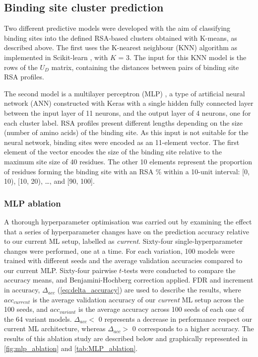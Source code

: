 \subsection{Binding site cluster prediction}

Two different predictive models were developed with the aim of classifying binding sites into the defined RSA-based clusters obtained with K-means, as described above. The first  uses the K-nearest neighbour (KNN) algorithm as implemented in Scikit-learn \cite{PEDREGOSA_2011_SKLEARN}, with $K$ = 3. The input for this KNN model is the rows of the $U_{D}$ matrix, containing the distances between pairs of binding site RSA profiles.

The second model is a multilayer perceptron (MLP) \cite{CYBENKO_1989_MLP}, a type of artificial neural network (ANN) constructed with Keras \cite{CHOLLET_2015_KERAS} with a single hidden fully connected layer between the input layer of 11 neurons, and the output layer of 4 neurons, one for each cluster label. RSA profiles present different lengths depending on the size (number of amino acids) of the binding site. As this input is not suitable for the neural network, binding sites were encoded as an 11-element vector. The first element of the vector encodes the size of the binding site relative to the maximum site size of 40 residues. The other 10 elements represent the proportion of residues forming the binding site with an RSA \% within a 10-unit interval: [0, 10), [10, 20), …, and [90, 100].

\subsubsection{MLP ablation}

A thorough hyperparameter optimisation was carried out by examining the effect that a series of hyperparameter changes have on the prediction accuracy relative to our current ML setup, labelled as \textit{current}. Sixty-four single-hyperparameter changes were performed, one at a time. For each variation, 100 models were trained with different seeds and the average validation accuracies compared to our current MLP. Sixty-four pairwise $t$-tests were conducted to compare the accuracy means, and Benjamini-Hochberg correction \cite{BENJAMINI_1995_FDR} applied. FDR and increment in accuracy, $\Delta_{acc}$ (\autoref{eq:delta_accuracy}) are used to describe the results, where $acc_{current}$ is the average validation accuracy of our \textit{current} ML setup across the 100 seeds, and $acc_{variant}$ is the average accuracy across 100 seeds of each one of the 64 variant models. $\Delta_{acc} <$ 0 represents a decrease in performance respect our current ML architecture, whereas $\Delta_{acc} >$ 0 corresponds to a higher accuracy. The results of this ablation study are described below and graphically represented in \autoref{fig:mlp_ablation} and \autoref{tab:MLP_ablation}.

